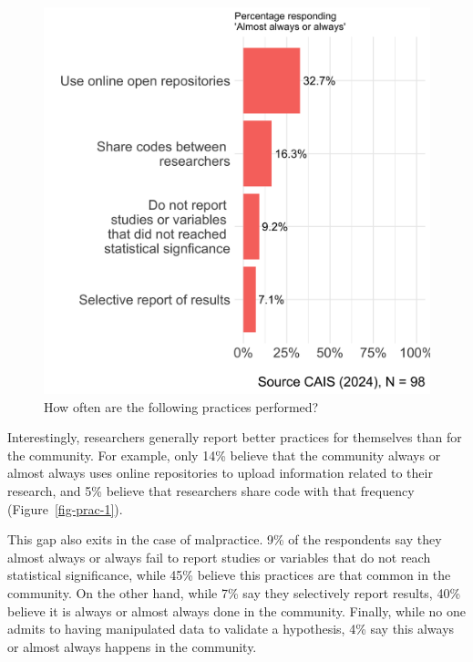 \documentclass[
  letterpaper,
  DIV=11,
  numbers=noendperiod]{scrartcl}
\begin{document}
\begin{figure}
\begin{minipage}[t]{0.50\linewidth}
{{\includegraphics{paper_files/figure-pdf/fig-prac-2.png}

}

}

\end{minipage}%

\caption{\label{fig-prac}How often are the following practices
performed?}

\end{figure}

Interestingly, researchers generally report better practices for
themselves than for the community. For example, only 14\% believe that
the community always or almost always uses online repositories to upload
information related to their research, and 5\% believe that researchers
share code with that frequency (Figure~\ref{fig-prac-1}).

This gap also exits in the case of malpractice. 9\% of the respondents
say they almost always or always fail to report studies or variables
that do not reach statistical significance, while 45\% believe this
practices are that common in the community. On the other hand, while 7\%
say they selectively report results, 40\% believe it is always or almost
always done in the community. Finally, while no one admits to having
manipulated data to validate a hypothesis, 4\% say this always or almost
always happens in the community.
\end{document}
